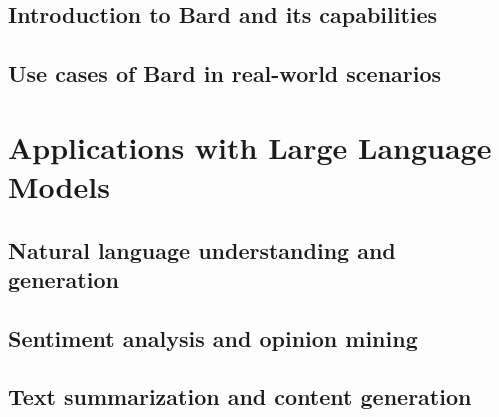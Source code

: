 \documentclass[
]{book}
\begin{document}
\hypertarget{introduction-to-bard-and-its-capabilities}{%
\section*{Introduction to Bard and its capabilities}\label{introduction-to-bard-and-its-capabilities}}

\hypertarget{use-cases-of-bard-in-real-world-scenarios}{%
\section*{Use cases of Bard in real-world scenarios}\label{use-cases-of-bard-in-real-world-scenarios}}

\hypertarget{applications-with-large-language-models}{%
\chapter*{Applications with Large Language Models}\label{applications-with-large-language-models}}

\hypertarget{natural-language-understanding-and-generation}{%
\section*{Natural language understanding and generation}\label{natural-language-understanding-and-generation}}

\hypertarget{sentiment-analysis-and-opinion-mining}{%
\section*{Sentiment analysis and opinion mining}\label{sentiment-analysis-and-opinion-mining}}

\hypertarget{text-summarization-and-content-generation}{%
\section*{Text summarization and content generation}\label{text-summarization-and-content-generation}}
\end{document}
